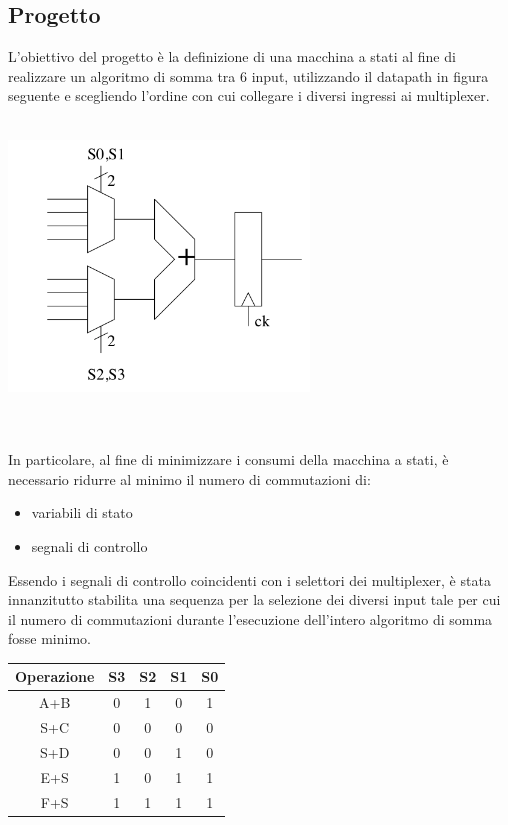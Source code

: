 \documentclass[11pt,  english, makeidx, a4paper, titlepage, oneside]{book}
\begin{document}
\subsection{Progetto}
L'obiettivo del progetto è la definizione di una macchina  a stati al fine di realizzare un algoritmo di somma tra 6 input, utilizzando il datapath in figura seguente e scegliendo l'ordine con cui collegare i diversi ingressi ai multiplexer.
\\\\
\centerline{\includegraphics[width=8cm]{./img/Lab_2/Datapath.png}}
\\\\   
In particolare, al fine di minimizzare i consumi della macchina a stati, è necessario ridurre al minimo il numero di commutazioni di:
\begin{itemize}
\item variabili di stato
\item segnali di controllo
\end{itemize} 
Essendo i segnali di controllo coincidenti con i selettori dei multiplexer, è stata innanzitutto stabilita una sequenza per la selezione dei diversi input tale per cui il numero di commutazioni durante l'esecuzione dell'intero algoritmo di somma fosse minimo.
\begin{center}
	\begin{tabular}{|c|c|c|c|c|}
	\hline
	Operazione & S3 & S2 & S1 & S0 \\ 
	\hline
	A+B & 0 & 1 & 0 & 1 \\
	\hline
	S+C & 0 & 0 & 0 & 0  \\
	\hline
	S+D & 0 & 0 & 1 & 0  \\
	\hline
    E+S & 1 & 0 & 1 & 1  \\
	\hline
	F+S & 1 & 1 & 1 & 1 \\
	\hline
	\end{tabular}	
\end{center}
\end{document}
